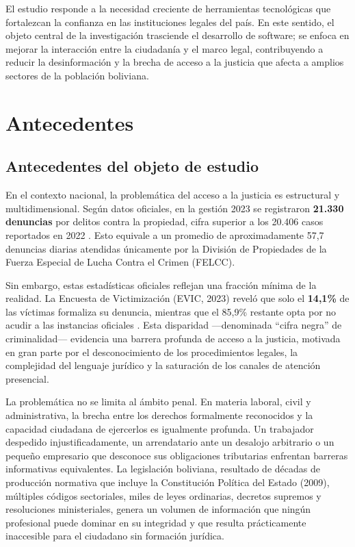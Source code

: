 \documentclass[12pt, letterpaper]{report}
\begin{document}
El estudio responde a la necesidad creciente de herramientas tecnol\'{o}gicas que fortalezcan la confianza en las instituciones legales del pa\'{i}s. En este sentido, el objeto central de la investigaci\'{o}n trasciende el desarrollo de software; se enfoca en mejorar la interacci\'{o}n entre la ciudadan\'{i}a y el marco legal, contribuyendo a reducir la desinformaci\'{o}n y la brecha de acceso a la justicia que afecta a amplios sectores de la poblaci\'{o}n boliviana.

\section{Antecedentes}

\subsection{Antecedentes del objeto de estudio}

En el contexto nacional, la problem\'{a}tica del acceso a la justicia es estructural y multidimensional. Seg\'{u}n datos oficiales, en la gesti\'{o}n 2023 se registraron \textbf{21.330 denuncias} por delitos contra la propiedad, cifra superior a los 20.406 casos reportados en 2022 \cite{el_pais_2025}. Esto equivale a un promedio de aproximadamente 57,7 denuncias diarias atendidas \'{u}nicamente por la Divisi\'{o}n de Propiedades de la Fuerza Especial de Lucha Contra el Crimen (FELCC).

Sin embargo, estas estad\'{i}sticas oficiales reflejan una fracci\'{o}n m\'{i}nima de la realidad. La Encuesta de Victimizaci\'{o}n (EVIC, 2023) revel\'{o} que solo el \textbf{14,1\%} de las v\'{i}ctimas formaliza su denuncia, mientras que el 85,9\% restante opta por no acudir a las instancias oficiales \cite{tic_bolivia_2025}. Esta disparidad ---denominada ``cifra negra'' de criminalidad--- evidencia una barrera profunda de acceso a la justicia, motivada en gran parte por el desconocimiento de los procedimientos legales, la complejidad del lenguaje jur\'{i}dico y la saturaci\'{o}n de los canales de atenci\'{o}n presencial.

La problem\'{a}tica no se limita al \'{a}mbito penal. En materia laboral, civil y administrativa, la brecha entre los derechos formalmente reconocidos y la capacidad ciudadana de ejercerlos es igualmente profunda. Un trabajador despedido injustificadamente, un arrendatario ante un desalojo arbitrario o un peque\~{n}o empresario que desconoce sus obligaciones tributarias enfrentan barreras informativas equivalentes. La legislaci\'{o}n boliviana, resultado de d\'{e}cadas de producci\'{o}n normativa que incluye la Constituci\'{o}n Pol\'{i}tica del Estado (2009), m\'{u}ltiples c\'{o}digos sectoriales, miles de leyes ordinarias, decretos supremos y resoluciones ministeriales, genera un volumen de informaci\'{o}n que ning\'{u}n profesional puede dominar en su integridad y que resulta pr\'{a}cticamente inaccesible para el ciudadano sin formaci\'{o}n jur\'{i}dica.
\end{document}
